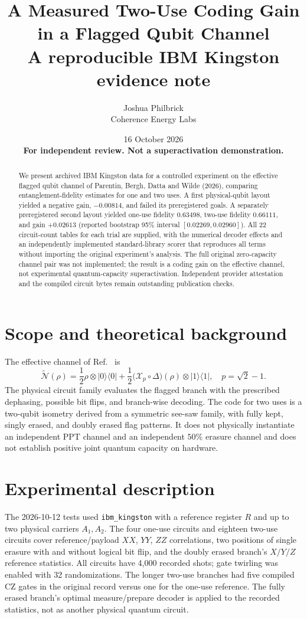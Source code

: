 \documentclass[11pt]{article}
\title{A Measured Two-Use Coding Gain in a Flagged Qubit Channel\\\large A reproducible IBM Kingston evidence note}
\author{Joshua Philbrick\\Coherence Energy Labs}
\date{16 October 2026\\\textbf{For independent review. Not a superactivation demonstration.}}
\begin{document}
\maketitle
\begin{abstract}
We present archived IBM Kingston data for a controlled experiment on the effective flagged qubit channel of Parentin, Bergh, Datta and Wilde (2026), comparing entanglement-fidelity estimates for one and two uses. A first physical-qubit layout yielded a negative gain, $-0.00814$, and failed its preregistered goals. A separately preregistered second layout yielded one-use fidelity $0.63498$, two-use fidelity $0.66111$, and gain $+0.02613$ (reported bootstrap 95\% interval $[0.02269,0.02960]$). All 22 circuit-count tables for each trial are supplied, with the numerical decoder effects and an independently implemented standard-library scorer that reproduces all terms without importing the original experiment's analysis. The full original zero-capacity channel pair was not implemented; the result is a coding gain on the effective channel, not experimental quantum-capacity superactivation. Independent provider attestation and the compiled circuit bytes remain outstanding publication checks.
\end{abstract}

\section{Scope and theoretical background}
The effective channel of Ref.~\cite{parentin} is
\begin{equation}
\widetilde{\mathcal N}(\rho)=\frac12\rho\otimes|0\rangle\langle0|+\frac12\bigl(\mathcal X_p\circ\Delta\bigr)(\rho)\otimes|1\rangle\langle1|,
\quad p=\sqrt2-1.
\end{equation}
The physical circuit family evaluates the flagged branch with the prescribed dephasing, possible bit flips, and branch-wise decoding. The code for two uses is a two-qubit isometry derived from a symmetric see-saw family, with fully kept, singly erased, and doubly erased flag patterns. It does not physically instantiate an independent PPT channel and an independent $50\%$ erasure channel and does not establish positive joint quantum capacity on hardware.

\section{Experimental description}
The 2026-10-12 tests used \texttt{ibm\_kingston} with a reference register $R$ and up to two physical carriers $A_1,A_2$. The four one-use circuits and eighteen two-use circuits cover reference/payload $XX$, $YY$, $ZZ$ correlations, two positions of single erasure with and without logical bit flip, and the doubly erased branch's $X/Y/Z$ reference statistics. All circuits have 4,000 recorded shots; gate twirling was enabled with 32 randomizations. The longer two-use branches had five compiled CZ gates in the original record versus one for the one-use reference. The fully erased branch's optimal measure/prepare decoder is applied to the recorded statistics, not as another physical quantum circuit.
\end{document}
